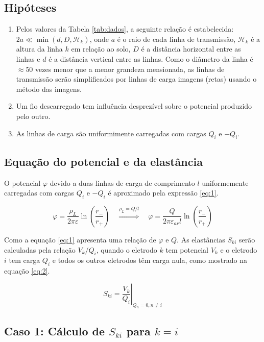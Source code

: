 \documentclass{aleph-revista}
\begin{document}
\subsection{Hipóteses}
\begin{enumerate}
  \item Pelos valores da Tabela \ref{tab:dados}, a seguinte relação é estabelecida: $2a \ll \min(d, D, \mathcal{H}_k)$, onde $a$ é o raio de cada linha de transmissão, $\mathcal{H}_k$ é a altura da linha $k$ em relação ao solo, $D$ é a distância horizontal entre as linhas e $d$ é a distância vertical entre as linhas. Como o diâmetro da linha é $\approx 50$ vezes menor que a menor grandeza mensionada, as linhas de transmissão serão simplificados por linhas de carga imagens (retas) usando o método das imagens.
  \item Um fio descarregado tem influência desprezível sobre o potencial produzido pelo outro.
  \item As linhas de carga são uniformimente carregadas com cargas $Q_i$ e $-Q_i$.
\end{enumerate}

\newpage
\subsection{Equação do potencial e da elastância}
O potencial $\varphi$ devido a duas linhas de carga de comprimento $l$ uniformemente carregadas com cargas $Q_i$ e $-Q_i$ é aproximado pela expressão \eqref{eq:1}.

\begin{equation}\label{eq:1}
  \varphi = \frac{\rho_L}{2\pi\varepsilon}\ln\left(\frac{r_-}{r_+}\right) \quad \overset{\rho_L=Q/l}{\Rightarrow} \quad \varphi = \frac{Q}{2\pi\varepsilon_{ar} l}\ln\left(\frac{r_-}{r_+}\right)
\end{equation}


Como a equação \eqref{eq:1} apresenta uma relação de $\varphi$ e $Q$. As elastâncias $S_{ki}$ serão calculadas pela relação $V_k/Q_i$, quando o eletrodo $k$ tem potencial $V_k$ e o eletrodo $i$ tem carga $Q_i$ e todos os outros eletrodos têm carga nula, como mostrado na equação \eqref{eq:2}.

\begin{equation}\label{eq:2}
  S_{ki}=\left.\frac{V_k}{Q_i}\right|_{Q_n=0, n\neq i}
\end{equation}


\subsection{Caso 1: Cálculo de $S_{ki}$ para $k=i$}
\end{document}

